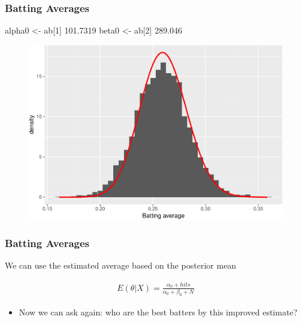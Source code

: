 \documentclass[
  shownotes,
  xcolor={svgnames},
  hyperref={colorlinks,citecolor=DarkBlue,linkcolor=DarkRed,urlcolor=DarkBlue}
  , aspectratio=169]{beamer}
\newenvironment{Shaded}{\begin{snugshade}}{\end{snugshade}}
\newcommand{\DecValTok}[1]{\textcolor[rgb]{0.00,0.00,0.81}{#1}}
\newcommand{\NormalTok}[1]{#1}
\newcommand{\StringTok}[1]{\textcolor[rgb]{0.31,0.60,0.02}{#1}}
\begin{document}
\begin{frame}[fragile]
\frametitle{Batting Averages}
\footnotesize
\begin{Shaded}
\begin{Highlighting}[]
\NormalTok{alpha0 \textless{}{-}}\StringTok{ }\NormalTok{ab[}\DecValTok{1}\NormalTok{]}
101.7319 
\NormalTok{beta0 \textless{}{-}}\StringTok{ }\NormalTok{ab[}\DecValTok{2}\NormalTok{]}
289.046 
\end{Highlighting}
\end{Shaded}



\begin{figure}[H] \centering
  \centering
  \includegraphics[scale=0.4]{figures/av_hist_w_mle.pdf}
  \\
  \tiny 
\end{figure}


\end{frame}
\begin{frame}[fragile]
\frametitle{Batting Averages}

We can use the estimated average based on the posterior mean

\begin{align}
E(\theta|X)=\frac{\alpha_0+hits}{\alpha_0+\beta_0+N}
\end{align}


\begin{itemize}
  \item Now we can ask again: who are the best batters by this improved estimate?
\end{itemize}



\end{frame}
\end{document}
